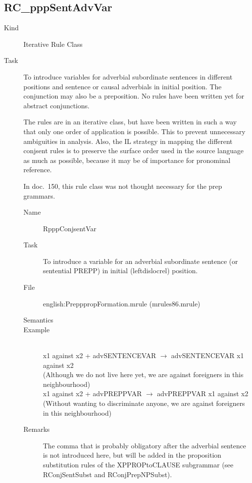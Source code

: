 \subsection{RC\_pppSentAdvVar}
\begin{description}
\item[Kind] Iterative Rule Class
\item[Task] To introduce variables for adverbial subordinate sentences in 
different positions and sentence or causal adverbials in initial position. The 
conjunction may also be a preposition. No rules have been written yet for 
abstract conjunctions.

The rules are in an iterative class, but have been written in such a way that 
only one order of application is possible. This to prevent unnecessary 
ambiguities in analysis. Also, the IL strategy in mapping the different 
conjsent rules is to preserve the surface order used in the source language as 
much as possible, because it may be of importance for pronominal reference.

In doc.\ 150, this rule class was not thought necessary for the prep grammars.

\vspace{1 cm}
\begin{description}
\item[Name] RpppConjsentVar
\item[Task] To introduce a variable for an adverbial subordinate sentence (or 
sentential PREPP) in initial (leftdislocrel) position.
\item[File] english:PrepppropFormation.mrule (mrules86.mrule)
\item[Semantics]
\item[Example] \mbox{}\\
x1 against x2 + advSENTENCEVAR $\rightarrow$ advSENTENCEVAR x1 
against x2 \\
(Although we do not live here yet, we are against foreigners in this 
neighbourhood)\\
x1 against x2 + advPREPPVAR $\rightarrow$ advPREPPVAR x1 against x2 \\
(Without wanting to discriminate anyone, we are against foreigners in this 
neighbourhood)
\item[Remarks] The comma that is probably obligatory after the adverbial 
sentence is not introduced here, but will be added in the proposition 
substitution rules of the XPPROPtoCLAUSE subgrammar (see RConjSentSubst and 
RConjPrepNPSubst).
\end{description}


\end{description}

